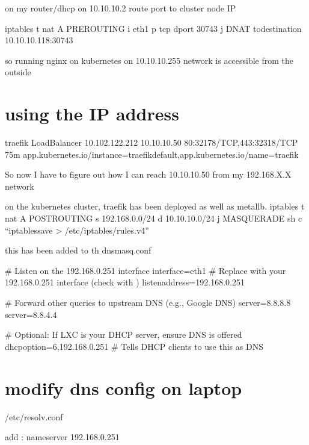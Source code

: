 \documentclass[letterpaper,10pt,english]{sphinxmanual}
\begin{document}
\sphinxAtStartPar
on my router/dhcp on 10.10.10.2 route port to cluster node IP

\sphinxAtStartPar
iptables \sphinxhyphen{}t nat \sphinxhyphen{}A PREROUTING \sphinxhyphen{}i eth1 \sphinxhyphen{}p tcp \textendash{}dport 30743 \sphinxhyphen{}j DNAT \textendash{}to\sphinxhyphen{}destination 10.10.10.118:30743

\sphinxAtStartPar
so running nginx on kubernetes on 10.10.10.255 network is accessible from the outside


\section{using the IP address}
\label{\detokenize{cluster:using-the-ip-address}}
\sphinxAtStartPar
traefik      LoadBalancer   10.102.122.212   10.10.10.50   80:32178/TCP,443:32318/TCP   75m   app.kubernetes.io/instance=traefik\sphinxhyphen{}default,app.kubernetes.io/name=traefik

\sphinxAtStartPar
So now I have to figure out how I can reach  10.10.10.50 from my 192.168.X.X network

\sphinxAtStartPar
on the kubernetes cluster, traefik has been deployed as well as metallb.
iptables \sphinxhyphen{}t nat \sphinxhyphen{}A POSTROUTING \sphinxhyphen{}s 192.168.0.0/24 \sphinxhyphen{}d 10.10.10.0/24 \sphinxhyphen{}j MASQUERADE
sh \sphinxhyphen{}c “iptables\sphinxhyphen{}save \textgreater{} /etc/iptables/rules.v4”

\sphinxAtStartPar
this has been added to th dnsmasq.conf

\sphinxAtStartPar
\# Listen on the 192.168.0.251 interface
interface=eth1  \# Replace with your 192.168.0.251 interface (check with )
listen\sphinxhyphen{}address=192.168.0.251

\sphinxAtStartPar
\# Forward other queries to upstream DNS (e.g., Google DNS)
server=8.8.8.8
server=8.8.4.4

\sphinxAtStartPar
\# Optional: If LXC is your DHCP server, ensure DNS is offered
dhcp\sphinxhyphen{}option=6,192.168.0.251  \# Tells DHCP clients to use this as DNS


\section{modify dns config on laptop}
\label{\detokenize{cluster:modify-dns-config-on-laptop}}
\sphinxAtStartPar
/etc/resolv.conf

\sphinxAtStartPar
add : nameserver 192.168.0.251
\end{document}
